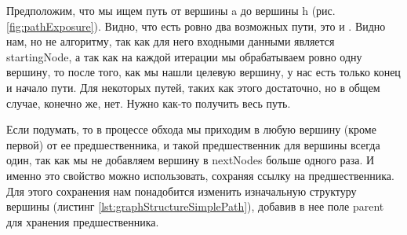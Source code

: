 \documentclass[../../article.tex]{subfiles}
\begin{document}
Предположим, что мы ищем путь от вершины {\firacodebold a} до вершины {\firacodebold h} (рис. \ref{fig:pathExposure}). Видно, что есть ровно два возможных пути, это {\firacodebold [a, h]} и {\firacodebold [a, f, g, h]}. Видно нам, но не алгоритму, так как для него входными данными является {\firacodebold startingNode}, а так как на каждой итерации мы обрабатываем ровно одну вершину, то после того, как мы нашли целевую вершину, у нас есть только конец и начало пути. Для некоторых путей, таких как {\firacodebold [a, h]} этого достаточно, но в общем случае, конечно же, нет. Нужно как-то получить весь путь.

Если подумать, то в процессе обхода мы приходим в любую вершину (кроме первой) от ее предшественника, и такой предшественник для вершины всегда один, так как мы не добавляем вершину в {\firacodebold nextNodes} больше одного раза. И именно это свойство можно использовать, сохраняя ссылку на предшественника. Для этого сохранения нам понадобится изменить изначальную структуру вершины (листинг \ref{lst:graphStructureSimplePath}), добавив в нее поле {\firacodebold parent} для хранения предшественника.
\end{document}
